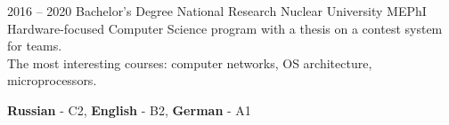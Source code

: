 \documentclass[9pt]{template}
\begin{document}


\begin{entrylist}
	\entry
	{2016 -- 2020}
	{Bachelor's Degree}
	{National Research Nuclear University MEPhI}
	{Hardware-focused Computer Science program with a thesis on a contest system for teams.\\ 
	The most interesting courses: computer networks, OS architecture, microprocessors.}
\end{entrylist}


\begin{minipage}[t]{0.6\textwidth}
	\vspace{-\baselineskip}
	
		
	\textbf{Russian} - C2, \textbf{English} - B2, \textbf{German} - A1
\end{minipage}


\end{document}
